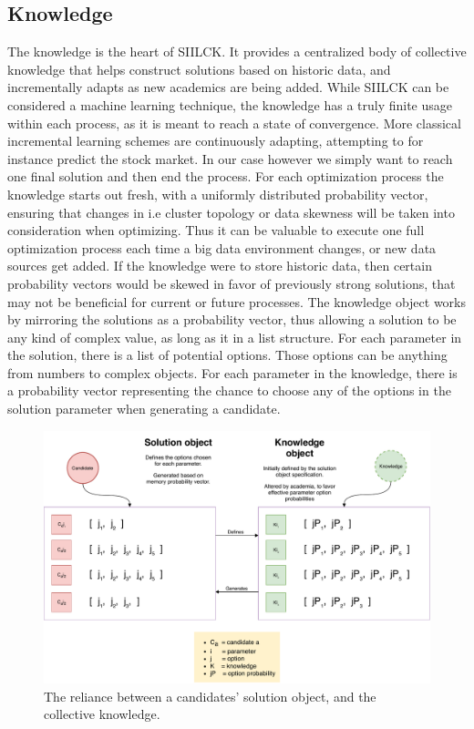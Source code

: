 \documentclass[a4paper,english]{report}
\begin{document}
		\subsection{Knowledge}
		\label{knowledge}
		The knowledge is the heart of SIILCK. It provides a centralized body of collective knowledge that helps construct solutions based on historic data, and incrementally adapts as new academics are being added. While SIILCK can be considered a machine learning technique, the knowledge has a truly finite usage within each process, as it is meant to reach a state of convergence. More classical incremental learning schemes are continuously adapting, attempting to for instance predict the stock market. In our case however we simply want to reach one final solution and then end the process. For each optimization process the knowledge starts out fresh, with a uniformly distributed probability vector, ensuring that changes in i.e cluster topology or data skewness will be taken into consideration when optimizing. Thus it can be valuable to execute one full optimization process each time a big data environment changes, or new data sources get added. If the knowledge were to store historic data, then certain probability vectors would be skewed in favor of previously strong solutions, that may not be beneficial for current or future processes. The knowledge object works by mirroring the solutions as a probability vector, thus allowing a solution to be any kind of complex value, as long as it in a list structure. For each parameter in the solution, there is a list of potential options. Those options can be anything from numbers to complex objects. For each parameter in the knowledge, there is a probability vector representing the chance to choose any of the options in the solution parameter when generating a candidate.
		\begin{figure}[h]
			\includegraphics[width=\textwidth]{memory_candidate}
			\caption{The reliance between a candidates' solution object, and the collective knowledge.}
		\end{figure}
		\clearpage
\end{document}
